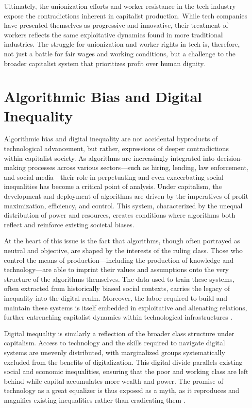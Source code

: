 Ultimately, the unionization efforts and worker resistance in the tech industry expose the contradictions inherent in capitalist production. While tech companies have presented themselves as progressive and innovative, their treatment of workers reflects the same exploitative dynamics found in more traditional industries. The struggle for unionization and worker rights in tech is, therefore, not just a battle for fair wages and working conditions, but a challenge to the broader capitalist system that prioritizes profit over human dignity.

\section{Algorithmic Bias and Digital Inequality}

Algorithmic bias and digital inequality are not accidental byproducts of technological advancement, but rather, expressions of deeper contradictions within capitalist society. As algorithms are increasingly integrated into decision-making processes across various sectors—such as hiring, lending, law enforcement, and social media—their role in perpetuating and even exacerbating social inequalities has become a critical point of analysis. Under capitalism, the development and deployment of algorithms are driven by the imperatives of profit maximization, efficiency, and control. This system, characterized by the unequal distribution of power and resources, creates conditions where algorithms both reflect and reinforce existing societal biases.

At the heart of this issue is the fact that algorithms, though often portrayed as neutral and objective, are shaped by the interests of the ruling class. Those who control the means of production—including the production of knowledge and technology—are able to imprint their values and assumptions onto the very structure of the algorithms themselves. The data used to train these systems, often extracted from historically biased social contexts, carries the legacy of inequality into the digital realm. Moreover, the labor required to build and maintain these systems is itself embedded in exploitative and alienating relations, further entrenching capitalist dynamics within technological infrastructures \cite[pp.~89-91]{noble2018}.

Digital inequality is similarly a reflection of the broader class structure under capitalism. Access to technology and the skills required to navigate digital systems are unevenly distributed, with marginalized groups systematically excluded from the benefits of digitalization. This digital divide parallels existing social and economic inequalities, ensuring that the poor and working class are left behind while capital accumulates more wealth and power. The promise of technology as a great equalizer is thus exposed as a myth, as it reproduces and magnifies existing inequalities rather than eradicating them \cite[pp.~42-44]{eubanks2018}.


